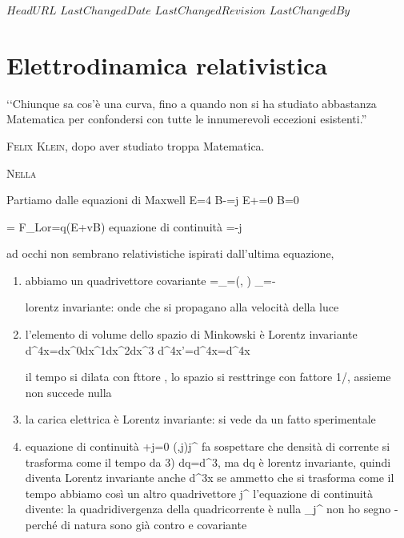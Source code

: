\svnidlong
{$HeadURL$}
{$LastChangedDate$}
{$LastChangedRevision$}
{$LastChangedBy$}

\chapter{Elettrodinamica relativistica}

\begin{introduction}
	‘‘Chiunque sa cos'è una curva, fino a quando non si ha studiato abbastanza Matematica per confondersi con tutte le innumerevoli eccezioni esistenti.''
	\begin{flushright}
		\textsc{Felix Klein,} dopo aver studiato troppa Matematica.
	\end{flushright}
\end{introduction}
\lettrine[findent=1pt, nindent=0pt]{N}{ella} 

Partiamo dalle equazioni di Maxwell
	\div\vba E=4\pi\rho
	\curl\vba B-=\vba j
	\curl\vba E+=0
	\div\vba B=0
	
	=
	\vba F_{Lor}=q\left(\vba E+\vba v\times \vba B\right)
	equazione di continuità =-\div\vba j
	
ad occhi non sembrano relativistiche
ispirati dall'ultima equazione, 
\begin{enumerate}
	\item abbiamo un quadrivettore covariante 
		=\partial_\mu=\left(, \grad\right) \implies \partial_\mu\partial\equiv \square =-\laplacian
	
	lorentz invariante: onde che si propagano alla velocità della luce
	\item 	l'elemento di volume dello spazio di Minkowski è Lorentz invariante
		d^4x=dx^0dx^1dx^2dx^3
		d^4x'=d^4x=\abs{\det \Gamma}d^4x
		
		il tempo si dilata con fttore \gamma, lo spazio si resttringe con fattore 1/\gamma, assieme non succede nulla
	\item	la carica elettrica è Lorentz invariante: si vede da un fatto sperimentale
	\item 	equazione di continuità
		+\div\vba j=0 \implies (\rho,\vba j)\equiv j^\mu
		fa sospettare che densità di corrente si trasforma come il tempo da 3)
			dq=\rho d^3, ma dq è lorentz invariante, quindi diventa Lorentz invariante anche \rho d^3x se ammetto che \rho si trasforma come il tempo
		abbiamo così un altro quadrivettore j^\mu
		l'equazione di continuità divente: la quadridivergenza della quadricorrente è nulla
			\partial_\mu j^
		non ho segno - perché di natura sono già contro e covariante
\end{enumerate}


